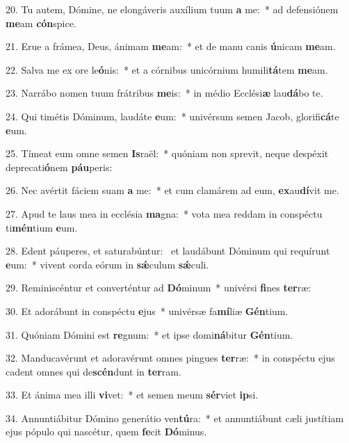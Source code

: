 20. Tu autem, Dómine, ne elongáveris auxílium tuum \textbf{a} me:~*  ad defensiónem \textbf{me}am \textbf{cón}spice.\

21. Erue a frámea, Deus, ánimam \textbf{me}am:~*  et de manu canis \textbf{ú}nicam \textbf{me}am.\

22. Salva me ex ore le\textbf{ó}nis:~*  et a córnibus unicórnium humili\textbf{tá}tem \textbf{me}am.\

23. Narrábo nomen tuum frátribus \textbf{me}is:~*  in médio Ecclési\textbf{æ} lau\textbf{dá}bo te.\

24. Qui timétis Dóminum, laudáte \textbf{e}um:~*  univérsum semen Jacob, glorifi\textbf{cá}te \textbf{e}um.\

25. Tímeat eum omne semen \textbf{Is}raël:~*  quóniam non sprevit, neque despéxit deprecati\textbf{ó}nem \textbf{páu}peris:\

26. Nec avértit fáciem suam \textbf{a} me:~*  et cum clamárem ad eum, \textbf{ex}au\textbf{dí}vit me.\

27. Apud te laus mea in ecclésia \textbf{ma}gna:~*  vota mea reddam in conspéctu ti\textbf{mén}tium \textbf{e}um.\

28. Edent páuperes, et saturabúntur: \dag\  et laudábunt Dóminum qui requírunt \textbf{e}um:~*  vivent corda eórum in \textbf{sǽ}culum \textbf{sǽ}culi.\

29. Reminiscéntur et converténtur ad \textbf{Dó}minum~*  univérsi \textbf{fi}nes \textbf{ter}ræ:\

30. Et adorábunt in conspéctu \textbf{e}jus~*  univérsæ fa\textbf{mí}liæ \textbf{Gén}tium.\

31. Quóniam Dómini est \textbf{re}gnum:~*  et ipse domi\textbf{ná}bitur \textbf{Gén}tium.\

32. Manducavérunt et adoravérunt omnes pingues \textbf{ter}ræ:~*  in conspéctu ejus cadent omnes qui de\textbf{scén}dunt in \textbf{ter}ram.\

33. Et ánima mea illi \textbf{vi}vet:~*  et semen meum \textbf{sér}viet \textbf{ip}si.\

34. Annuntiábitur Dómino generátio ven\textbf{tú}ra:~*  et annuntiábunt cæli justítiam ejus pópulo qui nascétur, quem \textbf{fe}cit \textbf{Dó}minus.\

